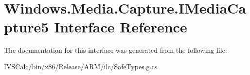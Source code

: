 \hypertarget{interface_windows_1_1_media_1_1_capture_1_1_i_media_capture5}{}\section{Windows.\+Media.\+Capture.\+I\+Media\+Capture5 Interface Reference}
\label{interface_windows_1_1_media_1_1_capture_1_1_i_media_capture5}


The documentation for this interface was generated from the following file\+:\begin{DoxyCompactItemize}
\item 
I\+V\+S\+Calc/bin/x86/\+Release/\+A\+R\+M/ilc/Safe\+Types.\+g.\+cs\end{DoxyCompactItemize}
